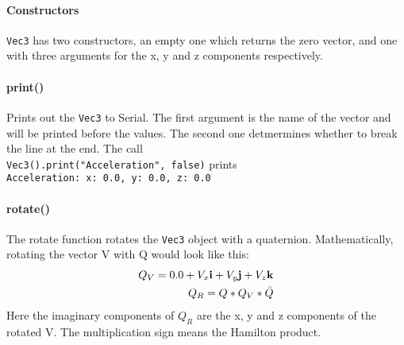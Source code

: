 \documentclass{article}
\begin{document}
\paragraph*{Constructors}
\verb|Vec3| has two constructors, an empty one which returns the zero vector, and one with three arguments for the x, y and z components respectively.

\paragraph*{print()}
Prints out the \verb|Vec3| to Serial. The first argument is the name of the vector and will be printed before the values. The second one detmermines whether to break the line
at the end. The call\\ 
\verb|Vec3().print("Acceleration", false)| prints \\
\verb|Acceleration: x: 0.0, y: 0.0, z: 0.0|

\paragraph*{rotate()}
The rotate function rotates the \verb|Vec3| object with a quaternion. Mathematically, rotating the vector V with Q would look like this:
\begin{eqnarray}
	Q_V = 0.0 + V_x\mathbf{i} + V_y\mathbf{j} + V_z\mathbf{k}\\
	Q_R = Q*Q_V*\Bar{Q}\\
\end{eqnarray}
Here the imaginary components of $Q_R$ are the x, y and z components of the rotated V. The multiplication sign means the Hamilton product.
\end{document}
